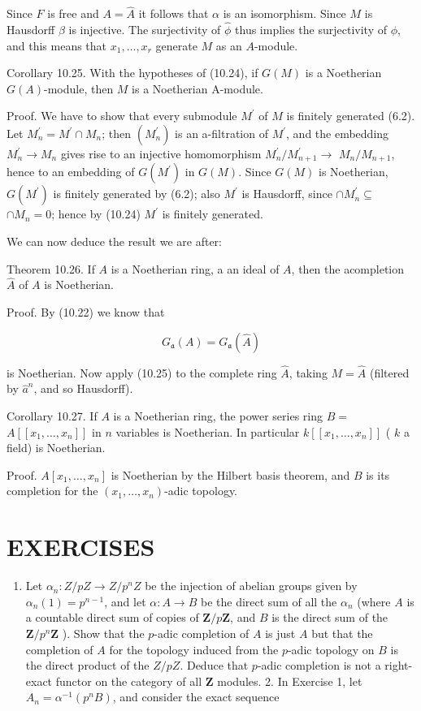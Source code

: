\documentclass{standalone}
\theoremstyle{definition}
\theoremstyle{remark}
\begin{document}
Since $F$ is free and $A=\hat{A}$ it follows that $\alpha$ is an isomorphism. Since $M$ is Hausdorff $\beta$ is injective. The surjectivity of $\hat{\phi}$ thus implies the surjectivity of $\phi$, and this means that $x_{1}, \ldots, x_{r}$ generate $M$ as an $A$-module.

Corollary 10.25. With the hypotheses of (10.24), if $G(M)$ is a Noetherian $G(A)$-module, then $M$ is a Noetherian A-module.

Proof. We have to show that every submodule $M^{\prime}$ of $M$ is finitely generated (6.2). Let $M_{n}^{\prime}=M^{\prime} \cap M_{n}$; then $\left(M_{n}^{\prime}\right)$ is an a-filtration of $M^{\prime}$, and the embedding $M_{n}^{\prime} \rightarrow M_{n}$ gives rise to an injective homomorphism $M_{n}^{\prime} / M_{n+1}^{\prime} \rightarrow$ $M_{n} / M_{n+1}$, hence to an embedding of $G\left(M^{\prime}\right)$ in $G(M)$. Since $G(M)$ is Noetherian, $G\left(M^{\prime}\right)$ is finitely generated by (6.2); also $M^{\prime}$ is Hausdorff, since $\cap M_{n}^{\prime} \subseteq$ $\cap M_{n}=0$; hence by (10.24) $M^{\prime}$ is finitely generated.

We can now deduce the result we are after:

Theorem 10.26. If $A$ is a Noetherian ring, a an ideal of $A$, then the acompletion $\hat{A}$ of $A$ is Noetherian.

Proof. By (10.22) we know that

\[
G_{\mathfrak{a}}(A)=G_{\mathfrak{a}}(\hat{A})
\]

is Noetherian. Now apply (10.25) to the complete ring $\hat{A}$, taking $M=\hat{A}$ (filtered by $\hat{a}^{n}$, and so Hausdorff).

Corollary 10.27. If $A$ is a Noetherian ring, the power series ring $B=$ $A\left[\left[x_{1}, \ldots, x_{n}\right]\right]$ in $n$ variables is Noetherian. In particular $k\left[\left[x_{1}, \ldots, x_{n}\right]\right]$ ( $k$ a field) is Noetherian.

Proof. $A\left[x_{1}, \ldots, x_{n}\right]$ is Noetherian by the Hilbert basis theorem, and $B$ is its completion for the $\left(x_{1}, \ldots, x_{n}\right)$-adic topology.

\section{EXERCISES}
\begin{enumerate}
  \item Let $\alpha_{n}: Z / p Z \rightarrow Z / p^{n} Z$ be the injection of abelian groups given by $\alpha_{n}(1)=p^{n-1}$, and let $\alpha: A \rightarrow B$ be the direct sum of all the $\alpha_{n}$ (where $A$ is a countable direct sum of copies of $\mathbf{Z} / p \mathbf{Z}$, and $B$ is the direct sum of the $\mathbf{Z} / p^{n} \mathbf{Z}$ ). Show that the $p$-adic completion of $A$ is just $A$ but that the completion of $A$ for the topology induced from the $p$-adic topology on $B$ is the direct product of the $Z / p Z$. Deduce that $p$-adic completion is not a right-exact functor on the category of all $\mathbf{Z}$ modules. 2. In Exercise 1, let $A_{n}=\alpha^{-1}\left(p^{n} B\right)$, and consider the exact sequence
\end{enumerate}
\end{document}
